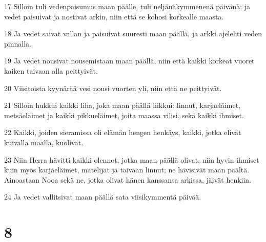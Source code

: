 \par 17 Silloin tuli vedenpaisumus maan päälle, tuli neljänäkymmenenä päivänä; ja vedet paisuivat ja nostivat arkin, niin että se kohosi korkealle maasta.
\par 18 Ja vedet saivat vallan ja paisuivat suuresti maan päällä, ja arkki ajelehti veden pinnalla.
\par 19 Ja vedet nousivat nousemistaan maan päällä, niin että kaikki korkeat vuoret kaiken taivaan alla peittyivät.
\par 20 Viisitoista kyynärää vesi nousi vuorten yli, niin että ne peittyivät.
\par 21 Silloin hukkui kaikki liha, joka maan päällä liikkui: linnut, karjaeläimet, metsäeläimet ja kaikki pikkueläimet, joita maassa vilisi, sekä kaikki ihmiset.
\par 22 Kaikki, joiden sieramissa oli elämän hengen henkäys, kaikki, jotka elivät kuivalla maalla, kuolivat.
\par 23 Niin Herra hävitti kaikki olennot, jotka maan päällä olivat, niin hyvin ihmiset kuin myös karjaeläimet, matelijat ja taivaan linnut; ne hävisivät maan päältä. Ainoastaan Nooa sekä ne, jotka olivat hänen kanssansa arkissa, jäivät henkiin.
\par 24 Ja vedet vallitsivat maan päällä sata viisikymmentä päivää.

\chapter{8}

